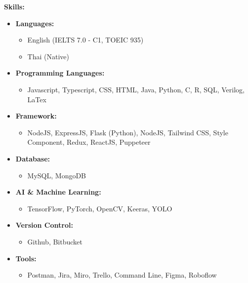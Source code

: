 \documentclass[a4paper,10pt]{article}
\begin{document}
\noindent
\textbf{Skills:}
\begin{itemize}[leftmargin=0.5cm]
    \item \textbf{Languages:}
          \begin{itemize}[leftmargin=0.5cm, noitemsep, topsep=0pt]
              \item English (IELTS 7.0 - C1, TOEIC 935)
              \item Thai (Native)
          \end{itemize}
    \item \textbf{Programming Languages:}
          \begin{itemize}[leftmargin=0.5cm, noitemsep, topsep=0pt]
              \item Javascript, Typescript, CSS, HTML, Java, Python, C, R, SQL, Verilog, LaTex
          \end{itemize}
    \item \textbf{Framework:}
          \begin{itemize}[leftmargin=0.5cm, noitemsep, topsep=0pt]
              \item NodeJS, ExpressJS, Flask (Python), NodeJS, Tailwind CSS, Style Component,
                    Redux, ReactJS, Puppeteer
          \end{itemize}
    \item \textbf{Database:}
          \begin{itemize}[leftmargin=0.5cm, noitemsep, topsep=0pt]
              \item MySQL, MongoDB
          \end{itemize}
    \item \textbf{AI \& Machine Learning:}
          \begin{itemize}[leftmargin=0.5cm, noitemsep, topsep=0pt]
              \item TensorFlow, PyTorch, OpenCV, Keeras, YOLO
          \end{itemize}
    \item \textbf{Version Control:}
          \begin{itemize}[leftmargin=0.5cm, noitemsep, topsep=0pt]
              \item Github, Bitbucket
          \end{itemize}

    \item \textbf{Tools:}
          \begin{itemize}[leftmargin=0.5cm, noitemsep, topsep=0pt]
              \item Postman, Jira, Miro, Trello, Command Line, Figma, Roboflow
          \end{itemize}
\end{itemize}
\end{document}
